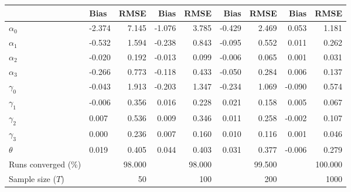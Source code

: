 
\begin{tabular}[t]{llrrrrrrr}
\toprule
  & Bias & RMSE & Bias & RMSE & Bias & RMSE & Bias & RMSE\\
\midrule
$\alpha_{0}$ & -2.374 & 7.145 & -1.076 & 3.785 & -0.429 & 2.469 & 0.053 & 1.181\\
$\alpha_{1}$ & -0.532 & 1.594 & -0.238 & 0.843 & -0.095 & 0.552 & 0.011 & 0.262\\
$\alpha_{2}$ & -0.020 & 0.192 & -0.013 & 0.099 & -0.006 & 0.065 & 0.001 & 0.031\\
$\alpha_{3}$ & -0.266 & 0.773 & -0.118 & 0.433 & -0.050 & 0.284 & 0.006 & 0.137\\
$\gamma_{0}$ & -0.043 & 1.913 & -0.203 & 1.347 & -0.234 & 1.069 & -0.090 & 0.574\\
$\gamma_{1}$ & -0.006 & 0.356 & 0.016 & 0.228 & 0.021 & 0.158 & 0.005 & 0.067\\
$\gamma_{2}$ & 0.007 & 0.536 & 0.009 & 0.346 & 0.011 & 0.258 & -0.002 & 0.107\\
$\gamma_{3}$ & 0.000 & 0.236 & 0.007 & 0.160 & 0.010 & 0.116 & 0.001 & 0.046\\
$\theta$ & 0.019 & 0.405 & 0.044 & 0.403 & 0.031 & 0.377 & -0.006 & 0.279\\
Runs converged (\%) &  & 98.000 &  & 98.000 &  & 99.500 &  & 100.000\\
Sample size ($T$) &  & 50 &  & 100 &  & 200 &  & 1000\\
\bottomrule
\end{tabular}
